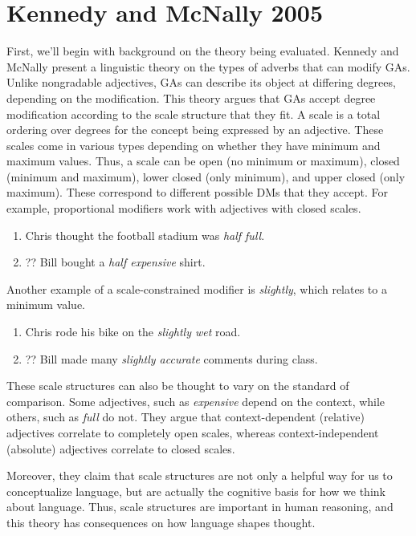 \documentclass[11pt]{article}
\begin{document}
\section{Kennedy and McNally 2005}

First, we'll begin with background on the theory being evaluated. Kennedy and McNally  present a linguistic theory on the types of adverbs that can modify GAs. Unlike nongradable adjectives, GAs can describe its object at differing degrees, depending on the modification. This theory argues that GAs accept degree modification according to the scale structure that they fit.  A scale is a total ordering over degrees for the concept being expressed by an adjective. These scales come in various types depending on whether they have minimum and maximum values. Thus, a scale can be open (no minimum or maximum), closed (minimum and maximum), lower closed (only minimum), and upper closed (only maximum). These correspond to different possible DMs that they accept. For example, proportional modifiers work with adjectives with closed scales.

\begin{enumerate}
\item Chris thought the football stadium was \textit{half full}.
\item ?? Bill bought a \textit{half expensive} shirt.
\end{enumerate}

Another example of a scale-constrained modifier is \textit{slightly}, which relates to a minimum value.

\begin{enumerate}
\item Chris rode his bike on the \textit{slightly wet} road.
\item ?? Bill made many \textit{slightly accurate} comments during class.
\end{enumerate}

These scale structures can also be thought to vary on the standard of comparison. Some adjectives, such as \textit{expensive} depend on the context, while others, such as \textit{full} do not. They argue that context-dependent (relative) adjectives correlate to completely open scales, whereas context-independent (absolute) adjectives correlate to closed scales. 

Moreover, they claim that scale structures are not only a helpful way for us to conceptualize language, but are actually the cognitive basis for how we think about language. Thus, scale structures are important in human reasoning, and this theory has consequences on how language shapes thought.
\end{document}
